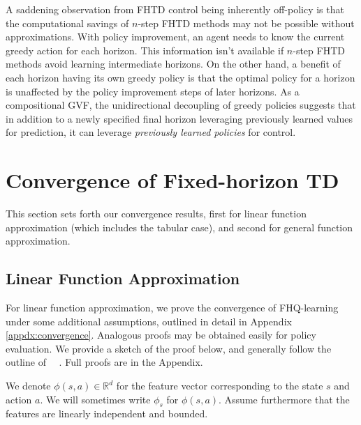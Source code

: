 \documentclass[letterpaper]{article} %
\newcommand{\R}{\mathbb{R}}
\newcommand{\params}{\mathbf{w}}
\begin{document}
A saddening observation from FHTD control being inherently off-policy is that the computational savings of $n$-step FHTD methods may not be possible without approximations.
With policy improvement, an agent needs to know the current greedy action for each horizon. This information isn't available if $n$-step FHTD methods avoid learning intermediate horizons.
On the other hand, a benefit of each horizon having its own greedy policy is that the optimal policy for a horizon is unaffected by the policy improvement steps of later horizons. As a compositional GVF, the unidirectional decoupling of greedy policies suggests that in addition to a newly specified final horizon leveraging previously learned values for prediction, it can leverage \textit{previously learned policies} for control.

\section{Convergence of Fixed-horizon TD}\label{sec:convergence}

This section sets forth our convergence results, first for linear function approximation (which includes the tabular case), and second for general function approximation.

\subsection{Linear Function Approximation}
For linear function approximation, we prove the convergence of FHQ-learning under some additional assumptions, outlined in detail in Appendix \ref{appdx:convergence}. Analogous proofs may be obtained easily for policy evaluation. We provide a sketch of the proof below, and generally follow the outline of ~\citeauthor{melo2007q}~. Full proofs are in the Appendix.

We denote $\phi(s, a) \in \R^d$ for the feature vector corresponding to the state $s$ and action $a$. We will sometimes write $\phi_s$ for $\phi(s, a)$. Assume furthermore that the features are linearly independent and bounded.

\end{document}
